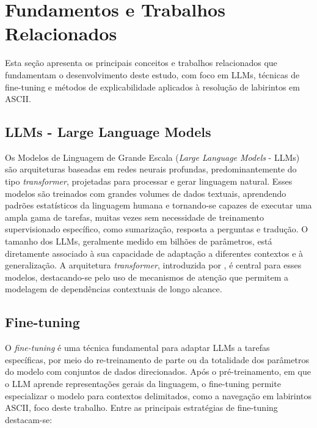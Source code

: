 \section{Fundamentos e Trabalhos Relacionados}

Esta seção apresenta os principais conceitos e trabalhos relacionados que fundamentam o desenvolvimento deste estudo, com foco em LLMs, técnicas de fine-tuning e métodos de explicabilidade aplicados à resolução de labirintos em ASCII.

\subsection{LLMs - Large Language Models}

Os Modelos de Linguagem de Grande Escala (\textit{Large Language Models} - LLMs) são arquiteturas baseadas em redes neurais profundas, predominantemente do tipo \textit{transformer}, projetadas para processar e gerar linguagem natural. Esses modelos são treinados com grandes volumes de dados textuais, aprendendo padrões estatísticos da linguagem humana e tornando-se capazes de executar uma ampla gama de tarefas, muitas vezes sem necessidade de treinamento supervisionado específico, como sumarização, resposta a perguntas e tradução. O tamanho dos LLMs, geralmente medido em bilhões de parâmetros, está diretamente associado à sua capacidade de adaptação a diferentes contextos e à generalização. A arquitetura \textit{transformer}, introduzida por \cite{vaswani2023transformers}, é central para esses modelos, destacando-se pelo uso de mecanismos de atenção que permitem a modelagem de dependências contextuais de longo alcance.

\subsection{Fine-tuning}

O \textit{fine-tuning} é uma técnica fundamental para adaptar LLMs a tarefas específicas, por meio do re-treinamento de parte ou da totalidade dos parâmetros do modelo com conjuntos de dados direcionados. Após o pré-treinamento, em que o LLM aprende representações gerais da linguagem, o fine-tuning permite especializar o modelo para contextos delimitados, como a navegação em labirintos ASCII, foco deste trabalho. Entre as principais estratégias de fine-tuning destacam-se:

